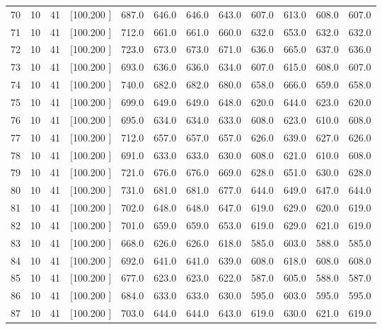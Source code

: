 \documentclass[12pt,a4paper]{article}
\begin{document}
\begin{center}
{\begin{tabular}{r r r r r r r r r r r r}
  70& 10& 41&[100.200   ]&   687.0&   646.0&   646.0&   643.0&   607.0&   613.0&   608.0&   607.0\\[-0.02in]
  71& 10& 41&[100.200   ]&   712.0&   661.0&   661.0&   660.0&   632.0&   653.0&   632.0&   632.0\\[-0.02in]
  72& 10& 41&[100.200   ]&   723.0&   673.0&   673.0&   671.0&   636.0&   665.0&   637.0&   636.0\\[-0.02in]
  73& 10& 41&[100.200   ]&   693.0&   636.0&   636.0&   634.0&   607.0&   615.0&   608.0&   607.0\\[-0.02in]
  74& 10& 41&[100.200   ]&   740.0&   682.0&   682.0&   680.0&   658.0&   666.0&   659.0&   658.0\\[-0.02in]
  75& 10& 41&[100.200   ]&   699.0&   649.0&   649.0&   648.0&   620.0&   644.0&   623.0&   620.0\\[-0.02in]
  76& 10& 41&[100.200   ]&   695.0&   634.0&   634.0&   633.0&   608.0&   623.0&   610.0&   608.0\\[-0.02in]
  77& 10& 41&[100.200   ]&   712.0&   657.0&   657.0&   657.0&   626.0&   639.0&   627.0&   626.0\\[-0.02in]
  78& 10& 41&[100.200   ]&   691.0&   633.0&   633.0&   630.0&   608.0&   621.0&   610.0&   608.0\\[-0.02in]
  79& 10& 41&[100.200   ]&   721.0&   676.0&   676.0&   669.0&   628.0&   651.0&   630.0&   628.0\\[-0.02in]
  80& 10& 41&[100.200   ]&   731.0&   681.0&   681.0&   677.0&   644.0&   649.0&   647.0&   644.0\\[-0.02in]
  81& 10& 41&[100.200   ]&   702.0&   648.0&   648.0&   647.0&   619.0&   629.0&   620.0&   619.0\\[-0.02in]
  82& 10& 41&[100.200   ]&   701.0&   659.0&   659.0&   653.0&   619.0&   629.0&   621.0&   619.0\\[-0.02in]
  83& 10& 41&[100.200   ]&   668.0&   626.0&   626.0&   618.0&   585.0&   603.0&   588.0&   585.0\\[-0.02in]
  84& 10& 41&[100.200   ]&   692.0&   641.0&   641.0&   639.0&   608.0&   618.0&   608.0&   608.0\\[-0.02in]
  85& 10& 41&[100.200   ]&   677.0&   623.0&   623.0&   622.0&   587.0&   605.0&   588.0&   587.0\\[-0.02in]
  86& 10& 41&[100.200   ]&   684.0&   633.0&   633.0&   630.0&   595.0&   603.0&   595.0&   595.0\\[-0.02in]
  87& 10& 41&[100.200   ]&   703.0&   644.0&   644.0&   643.0&   619.0&   630.0&   621.0&   619.0\\[-0.02in]

\end{tabular}}
\end{center}
\end{document}

